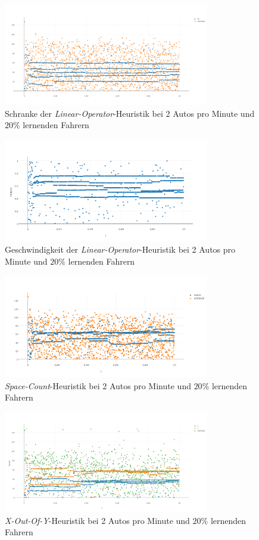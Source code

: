 \begin{figure}[H]
	\includegraphics[width=0.8\textwidth]{analyse/SomeMutants/2pm/linop.png}
	\caption{Schranke der \emph{Linear-Operator}-Heuristik bei 2 Autos pro Minute und $20\%$ lernenden Fahrern}\label{fig:ap_pm_loz_2}
\end{figure}
\begin{figure}[H]
	\includegraphics[width=0.8\textwidth]{analyse/SomeMutants/2pm/linopa2some.png}
	\caption{Geschwindigkeit der \emph{Linear-Operator}-Heuristik bei 2 Autos pro Minute und $20\%$ lernenden Fahrern}\label{fig:ap_pm_loa_2}
\end{figure}
\begin{figure}[H]
	\includegraphics[width=0.8\textwidth]{analyse/SomeMutants/2pm/space2some.png}
	\caption{\emph{Space-Count}-Heuristik bei 2 Autos pro Minute und $20\%$ lernenden Fahrern}\label{fig:ap_pm_sc_2}
\end{figure}
\begin{figure}[H]
	\includegraphics[width=0.8\textwidth]{analyse/SomeMutants/2pm/xy.png}
	\caption{\emph{X-Out-Of-Y}-Heuristik bei 2 Autos pro Minute und $20\%$ lernenden Fahrern}\label{fig:ap_pm_xy_2}
\end{figure}
